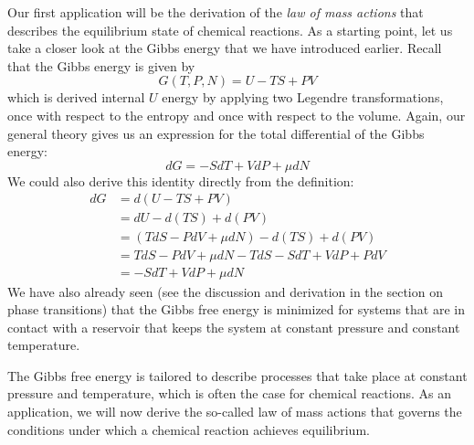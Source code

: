 \documentclass[a4paper, draft]{report}
\numberwithin{section}{chapter}
\numberwithin{equation}{chapter}
\theoremstyle{own}
\theoremstyle{remark}
\begin{document}
Our first application will be the derivation of the {\em law of mass actions} that describes the equilibrium state of chemical reactions. As a starting point, let us take a closer look at the Gibbs energy that we have introduced earlier. Recall that the Gibbs energy is given by
$$
G(T, P, N) = U - TS + PV
$$
which is derived internal $U$ energy by applying two Legendre transformations, once with respect to the entropy and once with respect to the volume. Again, our general theory gives us an expression for the total differential of the Gibbs energy:
$$
dG = - S dT + V dP + \mu dN
$$
We could also derive this identity directly from the definition:
\begin{align*}
dG &= d(U - TS + PV) \\
&= dU - d(TS) + d(PV) \\
&= (T dS - P dV  + \mu dN) - d(TS) + d(PV) \\
&= TdS - P dV + \mu dN - T dS - S dT + V dP + P dV \\
&=  - S dT + V dP + \mu dN  
\end{align*}
We have also already seen (see the discussion and derivation in the section on phase transitions) that the Gibbs free energy is minimized for systems that are in contact with a reservoir that keeps the system at constant pressure and constant temperature. 

The Gibbs free energy is tailored to describe processes that take place at constant pressure and temperature, which is often the case for chemical reactions. As an application, we will now derive the so-called law of mass actions that governs the conditions under which a chemical reaction achieves equilibrium.
\end{document}

